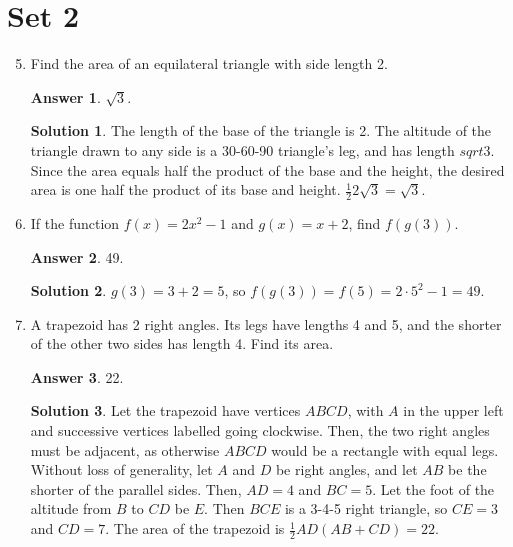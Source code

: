 \documentclass[11pt]{article}
\theoremstyle{definition}
\newtheorem*{solution}{Solution}
\newtheorem*{answer}{Answer}
\begin{document}
\section*{Set 2}
\begin{enumerate}
\setcounter{enumi}{4}
\item Find the area of an equilateral triangle with side length 2.

\begin{answer}
$\sqrt{3}$.
\end{answer}
\begin{solution} The length of the base of the triangle is 2. The altitude of the triangle drawn to any side is a 30-60-90 triangle’s leg, and has length $sqrt{3}$. Since the area equals half the product of the base and the height, the desired area is one half the product of its base and height. $\frac{1}{2} 2\sqrt{3} = \boxed{\sqrt{3}}$.

\end{solution}

\item If the function $f(x) = 2x^2 - 1$ and $g(x) = x + 2$, find $f(g(3))$.

\begin{answer}
49.
\end{answer}
\begin{solution} $g(3) = 3 + 2 = 5$, so $f(g(3)) = f(5) = 2 \cdot 5^2 - 1 = \boxed{49}$.

\end{solution}

\item A trapezoid has 2 right angles. Its legs have lengths 4 and 5, and the shorter of the other two sides has length 4. Find its area.

\begin{answer}
22.
\end{answer}
\begin{solution} Let the trapezoid have vertices $ABCD$, with $A$ in the upper left and successive vertices labelled going clockwise. Then, the two right angles must be adjacent, as otherwise $ABCD$ would be a rectangle with equal legs. Without loss of generality, let $A$ and $D$ be right angles, and let $AB$ be the shorter of the parallel sides. Then, $AD = 4$ and $BC = 5$. Let the foot of the altitude from $B$ to $CD$ be $E$. Then $BCE$ is a 3-4-5 right triangle, so $CE = 3$ and $CD = 7$. The area of the trapezoid is $\frac{1}{2} AD (AB + CD) = \boxed{22}$.

\end{solution}


\end{enumerate}
\end{document}
